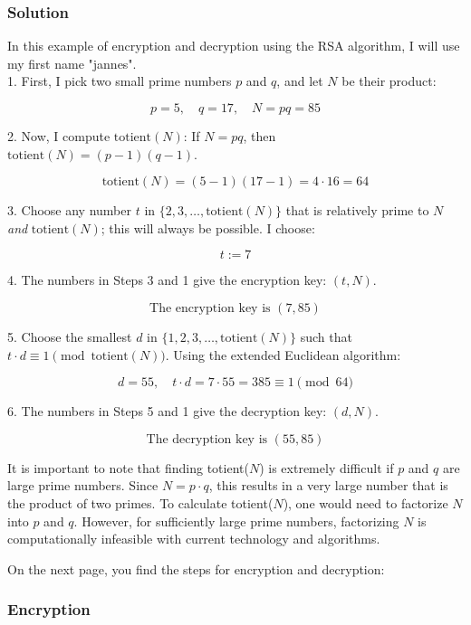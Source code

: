 \documentclass{article}
\begin{document}
\subsubsection*{Solution}

In this example of encryption and decryption using the RSA algorithm, I will use my first name "jannes".\\

1. First, I pick two small prime numbers \( p \) and \( q \), and let \( N \) be their product:

   \[
   p = 5, \quad q = 17, \quad N = pq = 85
   \]

2. Now, I compute \( \text{totient}(N) \): If \( N = pq \), then \( \text{totient}(N) = (p-1)(q-1) \).

   \[
   \text{totient}(N) = (5-1)(17-1) = 4 \cdot 16 = 64
   \]

3. Choose any number \( t \) in \( \{2,3,\dots,\text{totient}(N)\} \) that is relatively prime to \( N \) \textit{and} \( \text{totient}(N) \); this will always be possible. I choose:

   \[
   t := 7
   \]

4. The numbers in Steps 3 and 1 give the encryption key: \( (t, N) \).

   \[
   \text{The encryption key is } (7, 85)
   \]

5. Choose the smallest \( d \) in \( \{1,2,3,\dots,\text{totient}(N)\} \) such that \( t \cdot d \equiv 1 \pmod{\text{totient}(N)} \). Using the extended Euclidean algorithm:

   \[
   d = 55, \quad t \cdot d = 7 \cdot 55 = 385 \equiv 1 \pmod{64}
   \]

6. The numbers in Steps 5 and 1 give the decryption key: \( (d, N) \).

   \[
   \text{The decryption key is } (55, 85)
   \]

It is important to note that finding totient($N$) is extremely difficult if $p$ and $q$ are large prime numbers. Since $N = p \cdot q$, this results in a very large number that is the product of two primes. To calculate totient($N$), one would need to factorize $N$ into $p$ and $q$. However, for sufficiently large prime numbers, factorizing $N$ is computationally infeasible with current technology and algorithms.

On the next page, you find the steps for encryption and decryption:


   \newpage

\subsubsection*{Encryption}
\end{document}

